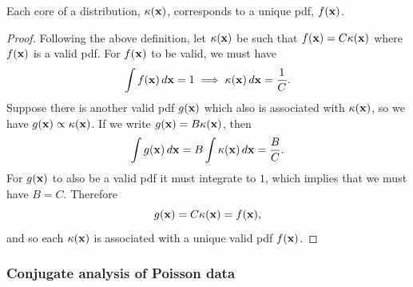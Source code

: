 \documentclass[10pt, a4paper]{article}
\begin{document}
\begin{lemma}
    Each core of a distribution,
    $\kappa(\mathbf{x})$,
    corresponds to a unique pdf,
    $f(\mathbf{x})$.

    \begin{proof}
        Following the above definition,
        let $\kappa(\mathbf{x})$ be such that $f(\mathbf{x}) = C\kappa(\mathbf{x})$ where $f(\mathbf{x})$ is a valid pdf.
        For $f(\mathbf{x})$ to be valid,
        we must have
        \[
        \int f(\mathbf{x})\,d\mathbf{x} = 1 \implies \kappa(\mathbf{x})\,d\mathbf{x} = \frac{1}{C}.
        \]
        Suppose there is another valid pdf $g(\mathbf{x})$ which also is associated with $\kappa(\mathbf{x})$,
        so we have $g(\mathbf{x}) \propto \kappa(\mathbf{x})$.
        If we write $g(\mathbf{x}) = B\kappa(\mathbf{x})$,
        then
        \[
        \int g(\mathbf{x})\,d\mathbf{x} = B\int\kappa(\mathbf{x})\,d\mathbf{x} = \frac{B}{C}.
        \]
        For $g(\mathbf{x})$ to also be a valid pdf it must integrate to $1$,
        which implies that we must have $B = C$.
        Therefore
        \[
        g(\mathbf{x}) = C\kappa(\mathbf{x}) = f(\mathbf{x}),
        \]
        and so each $\kappa(\mathbf{x})$ is associated with a unique valid pdf $f(\mathbf{x})$.
    \end{proof}
\end{lemma}

\subsubsection{Conjugate analysis of Poisson data}
\end{document}
